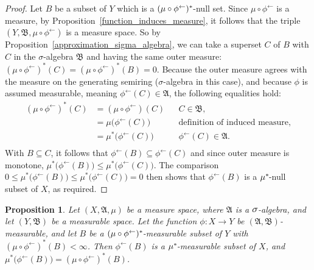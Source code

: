 \documentclass[
twoside=true,
paper=letter,
fontsize=9pt,
pagesize=auto,
leqno,
openany,
headsepline,
overfullrule,
]{scrbook}
\theoremstyle{plain}
\theoremstyle{plain}
\newtheorem{prop}[thm]{Proposition}
\theoremstyle{definition}
\theoremstyle{bfnoteitalic}
\theoremstyle{bfnoteroman}
\newcommand{\sigalg}[1]{\mathfrak{#1}}
\newcommand{\textsigma}{\hbox{\large{$\sigma$}}\kern-1pt}
\newcommand{\preimage}[1]{#1^{\leftarrow}}
\newcommand{\sigmaalgebra}{\sigalg{A}}
\newcommand{\sigmaalgebraii}{\sigalg{B}}
\newcommand{\kernast}{\ast\kern-1pt}
\newcommand{\measurespace}{X}
\newcommand{\measurespaceii}{Y}
\newcommand{\measure}{\mu}
\begin{document}
\begin{proof}
Let $B$ be a subset of $\measurespaceii$ which is a $(\measure\circ\preimage{\phi})^\kernast$-null set. Since $\measure\circ\preimage{\phi}$ is a measure, by Proposition~\ref{function_induces_measure}, it follows that
the triple $(\measurespaceii, \sigmaalgebraii, \measure\circ\preimage{\phi})$ is a measure space. So by Proposition~\ref{approximation_sigma_algebra}, we can take a superset $C$ of $B$ with $C$ in the \textsigma-algebra $\sigmaalgebraii$ and having the same outer measure: 
$(\measure\circ\preimage{\phi})^*(C) =
(\measure\circ\preimage{\phi})^*(B) =0$.
Because the outer measure agrees with the measure on the generating semiring (\textsigma-algebra in this case), and because $\phi$ is assumed measurable, meaning $\preimage{\phi}(C)\in\sigmaalgebra$, the following equalities hold:
\begin{align*}
(\measure\circ\preimage{\phi})^*(C)
& = (\measure\circ\preimage{\phi})(C)
&& \text{$C\in\sigmaalgebraii$,}
\\
& = \measure\bigl(\preimage{\phi}(C)\bigr)
&& \text{definition of induced measure,}
\\
& = \measure^*\bigl(\preimage{\phi}(C)\bigr)
&& \text{$\preimage{\phi}(C)\in\sigmaalgebra$.}
\\
\end{align*}
With $B\subseteq C$, it follows that $\preimage{\phi}(B)\subseteq\preimage{\phi}(C)$ and since outer measure is monotone, 
$\measure^*\bigl(\preimage{\phi}(B)\bigr)
\leq
\measure^*\bigl(\preimage{\phi}(C)\bigr)$. The comparison
$0 \leq \measure^*\bigl(\preimage{\phi}(B)\bigr)
\leq
\measure^*\bigl(\preimage{\phi}(C)\bigr) = 0$ then shows that $\preimage{\phi}(B)$ is a $\measure^\kernast$-null subset of $\measurespace$, as required.
\end{proof}


\begin{prop}\label{preimage_of_a_measurable_set}
Let $(\measurespace,\sigmaalgebra,\measure)$ be a measure space, where $\sigmaalgebra$ is a $\textsigma$-algebra, and let $(\measurespaceii, \sigmaalgebraii)$ be a measurable space.  Let the function $\phi:\measurespace\to\measurespaceii$ be $(\sigmaalgebra, \sigmaalgebraii)$\hyp{}measurable, and let  $B$ be a
$(\measure\circ\preimage{\phi})^\kernast$-measurable subset of $\measurespaceii$ with $(\measure\circ\preimage{\phi})^*(B)< \infty$.
Then $\preimage{\phi}(B)$ is a $\measure^\kernast$-measurable subset of $\measurespace$, and 
$\measure^*\bigl(\preimage{\phi}(B)\bigr) = (\measure\circ\preimage{\phi})^*(B)$. 
\end{prop}
\end{document}
